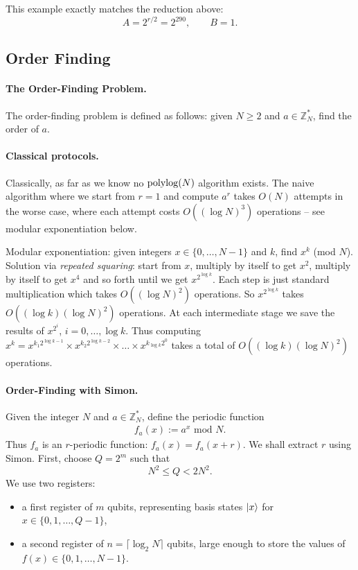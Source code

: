 This example exactly matches the reduction above:
\[
A=2^{r/2}=2^{290}, \qquad B=1.
\]



















\subsection{Order Finding}

\paragraph{The Order-Finding Problem.} The order-finding problem is defined as follows: given $N\geq 2$ and $a \in \mathbb{Z}_N^*$, find the order of $a$.

\paragraph{Classical protocols.} Classically, as far as we know no $\operatorname{polylog}(N)$ algorithm exists. The naive algorithm where we start from $r=1$ and compute $a^r$ takes $O(N)$ attempts in the worse case, where each attempt costs $O((\log N)^3)$ operations -- see modular exponentiation below. 

Modular exponentiation: given integers $x \in \{0,\dots,N-1\}$ and $k$, find $x^k$ (mod $N$). Solution via \textit{repeated squaring}: start from $x$, multiply by itself to get $x^2$, multiply by itself to get $x^4$ and so forth until we get $x^{2^{\log k}}$. Each step is just standard multiplication which takes $O((\log N)^2)$ operations. So $x^{2^{\log k}}$ takes $O((\log k)(\log N)^2)$ operations. At each intermediate stage we save the results of $x^{2^i}$, $i=0,\dots,\log k$. Thus computing $x^k = x^{k_1 2^{\log k-1}} \times x^{k_2 2^{\log k-2}} \times \dots \times x^{k_{\log k} 2^0}$ takes a total of $O((\log k)(\log N)^2)$ operations.

\paragraph{Order-Finding with Simon.} Given the integer $N$ and $a \in \mathbb{Z}_N^*$, define the periodic function
\begin{align*}
    f_a(x) := a^x \text{ mod } N.
\end{align*}
Thus $f_a$ is an $r$-periodic function: $f_a(x)=f_a(x+r)$. We shall extract $r$ using Simon. First, choose \(Q=2^m\) such that
\[
N^2 \leq Q < 2N^2.
\]
We use two registers:
\begin{itemize}
    \item a first register of \(m\) qubits, representing basis states \(\ket{x}\) for \(x\in\{0,1,\dots,Q-1\}\),
    \item a second register of \(n=\lceil \log_2 N\rceil\) qubits, large enough to store the values of \(f(x)\in\{0,1,\dots,N-1\}\).
\end{itemize}

